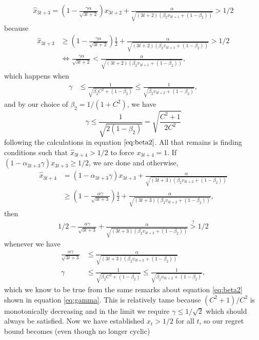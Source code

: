 \documentclass{article}
\newcommand{\1}{\mathbf{1}}                 %
\begin{document}
\begin{align*}
\hat{x}_{3t+3} =\left(1 - \frac{\gamma\alpha}{\sqrt{3t+2}}\right) x_{3t+2} + \frac{\alpha}{\sqrt{(3t+2)(\beta_2 v_{3t+1}+(1-\beta_2))}} > 1/2
\end{align*}
because 
\begin{align*}
    \hat{x}_{3t+3} &\geq \left(1 - \frac{\gamma\alpha}{\sqrt{3t+2}}\right) \frac{1}{2} + \frac{\alpha}{\sqrt{(3t+2)(\beta_2 v_{3t+1}+(1-\beta_2))}} > 1/2 \\ 
    &\iff \frac{\gamma\alpha}{\sqrt{3t+2}} < \frac{\alpha}{\sqrt{(3t+2)(\beta_2 v_{3t+1}+(1-\beta_2))}},
\end{align*}
which happens when 
\begin{align*}
    \gamma &\leq \frac{1}{\sqrt{\beta_2C^2 + (1-\beta_2)}} \leq \frac{1}{\sqrt{\beta_2v_{3t+2} + (1-\beta_2)}},
\end{align*}
and by our choice of \(\beta_2 = 1/(1+C^2)\), we have 
\begin{equation}
\gamma \leq \frac{1}{\sqrt{2(1-\beta_2)}} = \sqrt{\frac{C^2+1}{2C^2}} \label{eq:gamma}
\end{equation}
following the calculations in equation \(\eqref{eq:beta2}\). All that remains is finding conditions such that \(\hat{x}_{3t+4}> 1/2\) to force \(x_{3t+4} = 1\). If \((1-\alpha_{3t+3}\gamma)x_{3t+3}\geq 1/2\), we are done and otherwise,
\begin{align*}
    \hat{x}_{3t+4} &= (1-\alpha_{3t+3}\gamma)x_{3t+3} + \frac{\alpha}{\sqrt{(3t+3)(\beta_2v_{3t+2}+(1-\beta_2))}} \\ &\geq \left(1-\frac{\alpha\gamma}{\sqrt{3t+3}}\right)\frac{1}{2} + \frac{\alpha}{\sqrt{(3t+3)(\beta_2v_{3t+2}+(1-\beta_2))}},
\end{align*}
then
\begin{align*}
    1/2-\frac{\alpha\gamma}{\sqrt{3t+3}} + \frac{\alpha}{\sqrt{(3t+3)(\beta_2v_{3t+2}+(1-\beta_2))}} \stackrel{?}{>} 1/2 
\end{align*}
whenever we have 
\begin{align*}
    \frac{\alpha\gamma}{\sqrt{3t+3}} &\leq \frac{\alpha}{\sqrt{(3t+3)(\beta_2v_{3t+2}+(1-\beta_2))}} \\ 
    \gamma &\leq \frac{1}{\sqrt{\beta_2C^2 + (1-\beta_2)}} \leq \frac{1}{\sqrt{\beta_2v_{3t+2} + (1-\beta_2)}},
\end{align*}
which we know to be true from the same remarks about equation \eqref{eq:beta2} shown in equation \eqref{eq:gamma}. This is relatively tame because \((C^2+1)/C^2\) is monotonically decreasing and in the limit we require \(\gamma \leq 1/\sqrt{2}\) which should always be satisfied. Now we have established \(x_{t}>1/2\) for all \(t\), so our regret bound becomes (even though no longer cyclic)
\end{document}
